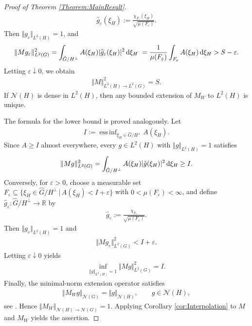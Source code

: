 \documentclass{article}
\renewcommand{\d}{\, \textup{d}}
\newcommand{\R}{\mathbb{R}}
\DeclareMathOperator*{\essinf}{ess\,inf}
\begin{document}
\begin{appendices}
\begin{proof}[Proof of Theorem \ref{Theorem:MainResult}]
\begin{align*}
    \hat g_\varepsilon(\xi_H)
:=
\frac{\chi_{F_\varepsilon}(\xi_H)}
{\sqrt{\mu(F_\varepsilon)}} .
\end{align*}
Then $\Vert g_\varepsilon \Vert_{L^2(H)}=1$, and 
\begin{align*}
    \Vert Mg_\varepsilon \Vert_{L^2(G)}^2
=
\int_{\hat G/H^\perp}
A(\xi_H)|\widehat g_\varepsilon(\xi_H)|^2 \d\xi_H \
=
\frac{1}{\mu(F_\varepsilon)}
\int_{F_\varepsilon}
A(\xi_H) \d\xi_H
>
S-\varepsilon .
\end{align*}
Letting $\varepsilon\downarrow 0$, we obtain
\begin{align*}
    \Vert M\Vert_{L^2(H)\to L^2(G)}^2
=
S.
\end{align*}
If $\mathcal N(H)$ is dense in $L^2(H)$, then any bounded extension of $M_W$ to $L^2(H)$ is unique. 

The formula for the lower bound is proved analogously. Let 
\begin{align*}
  I:=    \essinf_{\xi_H \in \hat{G}/H^\perp} A(\xi_H).
\end{align*}
Since $A\geq I$ almost everywhere, every $g\in L^2(H)$ with
$\Vert g \Vert_{L^2(H)}=1$ satisfies 
\begin{align*}
    \Vert Mg \Vert_{L^2(G)}^2
=
\int_{\hat G/H^\perp}
A(\xi_H)|\hat g(\xi_H)|^2 \d\xi_H
\geq I.
\end{align*}
Conversely, for $\varepsilon>0$, choose a measurable set
$F_\varepsilon\subseteq\{\xi_H \in \hat{G}/H^\perp \, \vert \, A(\xi_H)<I+\varepsilon\}$ with
$0<\mu(F_\varepsilon)<\infty$, and define $\hat{g}_\varepsilon: \hat{G}/H^\perp \to \R$ by
\begin{align*}
    \hat g_\varepsilon
:=
\frac{\chi_{F_\varepsilon}}{\sqrt{\mu(F_\varepsilon)}}.
\end{align*}
Then $\Vert g_\varepsilon \Vert_{L^2(H)}=1$ and 
\begin{align*}
    \Vert Mg_\varepsilon\Vert_{L^2(G)}^2
<
I+\varepsilon .
\end{align*}
Letting $\varepsilon\downarrow 0$ yields 
\begin{align*}
    \inf_{\Vert g \Vert_{L^2(H)}=1}
\Vert Mg\Vert_{L^2(G)}^2
=
I.
\end{align*}
Finally, the minimal-norm extension operator satisfies 
\begin{align*}
    \Vert M_Wg \Vert_{\mathcal N(G)}
= 
\Vert g\Vert_{\mathcal N(H)},
\qquad g\in\mathcal N(H), 
\end{align*}
see \cite[Theorem 10.46]{wendland2004scattered}. Hence $\Vert M_W\Vert_{\mathcal{N}(H) \to \mathcal{N}(G) } =1$. 
Applying Corollary \ref{cor:Interpolation} to $M$ and $M_W$ yields the assertion.
\end{proof}




\end{appendices}
\end{document}
